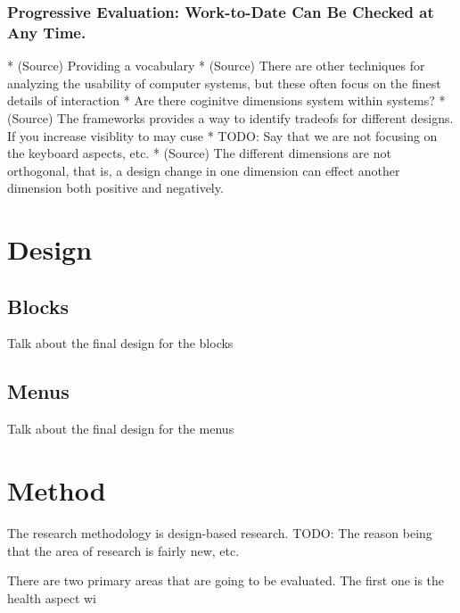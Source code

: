\documentclass[screen, sigcconf]{timtm}
\begin{document}
\subsubsection{Progressive Evaluation: Work-to-Date Can Be Checked at Any Time.}



* (Source) Providing a vocabulary
  * (Source) There are other techniques for analyzing the usability of computer systems, but these often focus on the finest details of interaction 
* Are there coginitve dimensions system within systems?
* (Source) The frameworks provides a way to identify tradeofs for different designs. If you increase visiblity to may cuse 
* TODO: Say that we are not focusing on the keyboard aspects, etc.
* (Source) The different dimensions are not orthogonal, that is, a design change in one dimension can effect another dimension both positive and negatively.



\section{Design}

\subsection{Blocks}
Talk about the final design for the blocks

\subsection{Menus}
Talk about the final design for the menus

\section{Method}
The research methodology is design-based research. TODO: The reason being that the area of research is fairly new, etc.

There are two primary areas that are going to be evaluated. The first one is the health aspect wi
\end{document}
